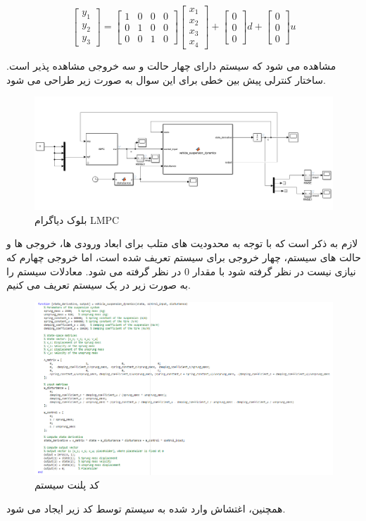 \[
\begin{bmatrix}
	y_1 \\ y_2 \\ y_3
\end{bmatrix}
=
\begin{bmatrix}
	1 & 0 & 0 & 0 \\
	0 & 1 & 0 & 0 \\
	0 & 0 & 1 & 0
\end{bmatrix}
\begin{bmatrix}
	x_1 \\ x_2 \\ x_3 \\ x_4
\end{bmatrix}
+
\begin{bmatrix}
	0 \\ 0 \\ 0
\end{bmatrix}
d
+
\begin{bmatrix}
	0 \\ 0 \\ 0
\end{bmatrix}
u
\]

مشاهده می شود که سیستم دارای چهار حالت و سه خروجی مشاهده پذیر است.
ساختار کنترلی پیش بین خطی برای این سوال به صورت زیر طراحی می شود.
\begin{figure}[H]
	\centering
	\includegraphics[width=1\linewidth]{../img/1}
	\caption{بلوک دیاگرام LMPC}
	\label{fig:1}
\end{figure}
لازم به ذکر است که با توجه به محدودیت های متلب برای ابعاد ورودی ها، خروجی ها و حالت های سیستم، چهار خروجی برای سیستم تعریف شده است، اما خروجی چهارم که نیازی نیست در نظر گرفته شود با مقدار 0 در نظر گرفته می شود.
معادلات سیستم را به صورت زیر در یک سیستم تعریف می کنیم.
\begin{figure}[H]
	\centering
	\includegraphics[width=1\linewidth]{../img/2}
	\caption{کد پلنت سیستم}
	\label{fig:2}
\end{figure}
همچنین، اغتشاش وارد شده به سیستم توسط کد زیر ایجاد می شود.

